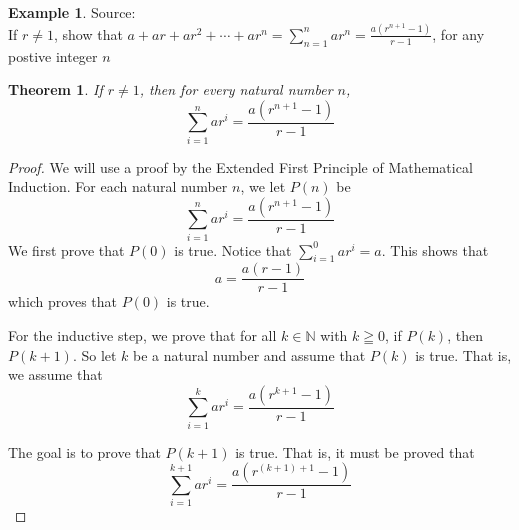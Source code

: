 \documentclass{book}
\newtheorem{theorem}{Theorem}[section]
\theoremstyle{definition}
\newtheorem{example}{Example}[definition]
\theoremstyle{remark}
\newcommand{\bb}[1]{\mathbb{#1}}
\begin{document}
\newpage
\begin{example}
Source: \cite[Chap.1, S.1.1, Prob.1.1, Q.2]{david} \\ 

If $r \neq 1$, show that $a + ar + ar^2  + \cdots + ar^n = \sum_{n=1}^{n}{ar^n} = \frac{a(r^{n+1} - 1)}{r - 1}$, for any postive integer $n$ 
    \begin{tcolorbox}
        \begin{theorem}
            If $r \neq 1$, then for every natural number $n$,
                \begin{equation*}
                    \sum_{i=1}^{n}{ar^i} = \frac{a(r^{n+1} - 1)}{r - 1}
                \end{equation*}
        \end{theorem}
    \end{tcolorbox}

    \begin{proof}
        We will use a proof by the Extended First Principle of Mathematical Induction. For each natural number $n$, we let $P(n)$ be
            \begin{equation*}
                \sum_{i=1}^{n}{ar^i} = \frac{a(r^{n+1} - 1)}{r - 1}
            \end{equation*}
        We first prove that $P(0)$ is true. Notice that $\sum_{i=1}^{0}{ar^i} = a$. This shows that   
            \begin{equation*}
                 a = \frac{a(r - 1)}{r - 1}
            \end{equation*}
        which proves that $P(0)$ is true. 
        
        For the inductive step, we prove that for all $k \in \bb{N}$ with $k \geqq 0$, if $P(k)$, then $P(k+1)$. So let $k$ be a natural number and assume that $P(k)$ is true. That is, we assume that 
            \begin{equation*}
                    \sum_{i=1}^{k}{ar^i} = \frac{a(r^{k+1} - 1)}{r - 1}                
            \end{equation*}
        
        The goal is to prove that $P(k+1)$ is true. That is, it must be proved that  
            \begin{equation}
            \label{dne6}
                \sum_{i=1}^{k+1}{ar^i} = \frac{a(r^{(k+1)+1} - 1)}{r - 1}             
            \end{equation}
        

\end{proof}
\end{example}
\end{document}
